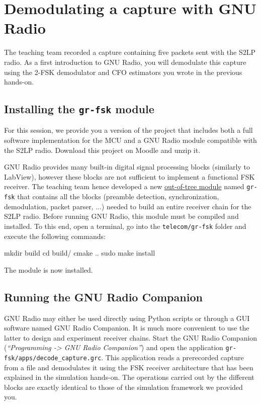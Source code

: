 \section{Demodulating a capture with GNU Radio}

The teaching team recorded a capture containing five packets sent with the S2LP radio.
As a first introduction to GNU Radio, you will demodulate this capture using the 2-FSK demodulator and CFO estimators you wrote in the previous hands-on.

\subsection{Installing the \texttt{gr-fsk} module}

For this session, we provide you a version of the project that includes both a full software implementation for the MCU and a GNU Radio
module compatible with the S2LP radio. Download this project on Moodle and unzip it.

GNU Radio provides many built-in digital signal processing blocks (similarly to LabView), however these blocks are not sufficient to implement a functional FSK receiver.
The teaching team hence developed a new \href{https://wiki.gnuradio.org/index.php/OutOfTreeModules}{out-of-tree module} named
\texttt{gr-fsk} that contains all the blocks (preamble detection, synchronization, demodulation, packet parser, ...) needed to build an entire receiver chain for the S2LP radio.
Before running GNU Radio, this module must be compiled and installed. To this end, open a terminal, go into the \texttt{telecom/gr-fsk} folder and execute the following commands:
\begin{bash}
    mkdir build
    cd build/
    cmake ..
    sudo make install
\end{bash}
The module is now installed.

\subsection{Running the GNU Radio Companion}

GNU Radio may either be used directly using Python scripts or through a GUI software named GNU Radio Companion. It is much more convenient to use the latter to design and experiment receiver chains.
Start the GNU Radio Companion (\textit{``Programming -> GNU Radio Companion''}) and open the application \texttt{gr-fsk/apps/decode\_capture.grc}.
This application reads a prerecorded capture from a file
and demodulates it using the FSK receiver architecture that has been explained in the simulation hands-on. The operations carried out by the different blocks are exactly identical to those of the simulation framework we provided you.

